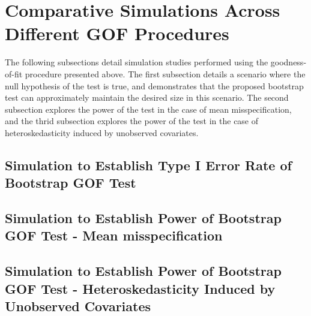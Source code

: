 		\section{Comparative Simulations Across Different GOF Procedures} \label{sec:gof_sim}

		The following subsections detail simulation studies performed using the goodness-of-fit procedure presented above. The first subsection details a scenario where the null
		hypothesis of the test is true, and demonstrates that the proposed bootstrap test can approximately maintain the desired size in this scenario. The second subsection 
		explores the power of the test in the case of mean misspecification, and the thrid subsection explores the power of the test in the case of heteroskedasticity induced by
		unobserved covariates.

		\subsection{Simulation to Establish Type I Error Rate of Bootstrap GOF Test}


		\subsection{Simulation to Establish Power of Bootstrap GOF Test - Mean misspecification}


		\subsection{Simulation to Establish Power of Bootstrap GOF Test - Heteroskedasticity Induced by Unobserved Covariates}